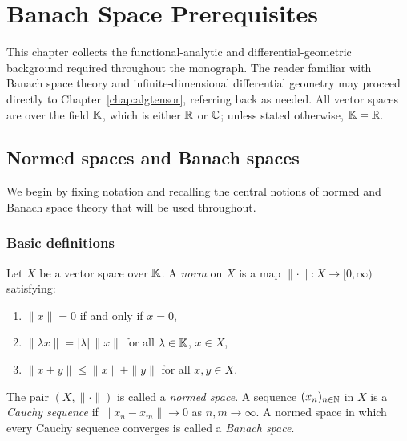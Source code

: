 %
%

\chapter{Banach Space Prerequisites}
\label{chap:banach}

This chapter collects the functional-analytic and differential-geometric
background required throughout the monograph. The reader familiar with
Banach space theory and infinite-dimensional differential geometry may
proceed directly to Chapter~\ref{chap:algtensor}, referring back as needed.
All vector spaces are over the field $\mathbb{K}$, which is either $\mathbb{R}$ or $\mathbb{C}$;
unless stated otherwise, $\mathbb{K} = \mathbb{R}$.

\section{Normed spaces and Banach spaces}
\label{sec:banach:basics}

We begin by fixing notation and recalling the central notions of normed and
Banach space theory that will be used throughout.

\subsection*{Basic definitions}

Let $X$ be a vector space over $\mathbb{K}$. A \emph{norm} on $X$ is a map
$\|\cdot\|: X \to [0,\infty)$ satisfying:
\begin{enumerate}
\item[(N1)] $\|x\| = 0$ if and only if $x = 0$,
\item[(N2)] $\|\lambda x\| = |\lambda|\,\|x\|$ for all $\lambda \in \mathbb{K}$,
    $x \in X$,
\item[(N3)] $\|x + y\| \leq \|x\| + \|y\|$ for all $x, y \in X$.
\end{enumerate}
The pair $(X, \|\cdot\|)$ is called a \emph{normed space}. A sequence
$(x_n)_{n \in \mathbb{N}}$ in $X$ is a \emph{Cauchy sequence} if
$\|x_n - x_m\| \to 0$ as $n, m \to \infty$. A normed space in which every
Cauchy sequence converges is called a \emph{Banach space}.

